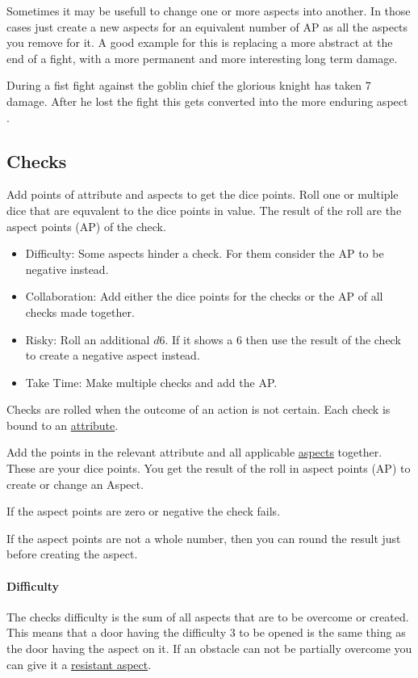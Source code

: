 \documentclass[11pt]{article}
\begin{document}
{Sometimes it may be usefull to change one or more aspects into another. In those cases just create a new aspects for an equivalent number of AP as all the aspects you remove for it.
A good example for this is replacing a more abstract  at the end of a fight, with a more permanent and more interesting long term damage.

\begin{pwexample}
During a fist fight against the goblin chief the glorious knight has taken 7 damage. After he lost the fight this gets converted into the more enduring aspect . 
\end{pwexample}
\subsection{Checks}
\label{sec:org9fdabcb}
\begin{short}
Add points of attribute and aspects to get the dice points. Roll one or multiple dice that are equvalent to the dice points in value. The result of the roll are the aspect points (AP) of the check.
\begin{itemize}
\item Difficulty: Some aspects hinder a check. For them consider the AP to be negative instead.
\item Collaboration: Add either the dice points for the checks or the AP of all checks made together.
\item Risky: Roll an additional \(d6\). If it shows a \(6\) then use the result of the check to create a negative aspect instead.
\item Take Time: Make multiple checks and add the AP.
\end{itemize}
\end{short}

Checks are rolled when the outcome of an action is not certain. Each check is bound to an \hyperref[sec:org3a61d39]{attribute}.

Add the points in the relevant attribute and all applicable \hyperref[sec:org0650927]{aspects} together. These are your dice points. You get the result of the roll in aspect points (AP) to create or change an Aspect.

If the aspect points are zero or negative the check fails.

If the aspect points are not a whole number, then you can round the result just before creating the aspect.
\paragraph*{Difficulty}
\label{sec:org228e1d8}
The checks difficulty is the sum of all aspects that are to be overcome or created. This means that a door having the difficulty 3 to be opened is the same thing as the door having the aspect  on it. If an obstacle can not be partially overcome you can give it a \hyperref[sec:org73f5544]{resistant aspect}.

}
\end{document}
